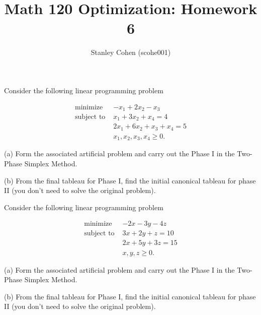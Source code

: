 \documentclass[12pt]{extarticle}
\title{Math 120 Optimization: Homework 6}
\author{Stanley Cohen (scohe001)}
\date{}
\theoremstyle{definition}
\begin{document}
\maketitle

\begin{problem} Consider the following linear programming problem

  	\begin{align*}
	\text{minimize } &-x_1+2x_2-x_3\\
	\text{subject to } & x_1+3x_2+x_4=4\\
	&2x_1+6x_2+x_3+x_4=5\\
	&x_1,x_2,x_3,x_4\geq 0.
	\end{align*}

	\begin{description}
		\item{(a)} Form the associated artificial problem and carry out the Phase I in the Two-Phase Simplex Method.\\
		\item{(b)} From the final tableau for Phase I, find the initial canonical tableau for phase II (you don't need to solve the original problem).
	\end{description}

\end{problem}

\begin{problem} Consider the following linear programming problem

  	\begin{align*}
	\text{minimize } &-2x-3y-4z\\
	\text{subject to } & 3x+2y+z=10\\
	&2x+5y+3z=15\\
	&x,y,z\geq 0.
	\end{align*}

	\begin{description}
		\item{(a)} Form the associated artificial problem and carry out the Phase I in the Two-Phase Simplex Method.\\
		\item{(b)} From the final tableau for Phase I, find the initial canonical tableau for phase II (you don't need to solve the original problem).
	\end{description}

\end{problem}
\end{document}
